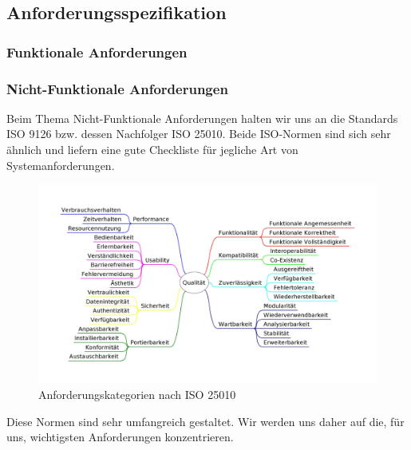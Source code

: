 \subsection{Anforderungsspezifikation}

\subsubsection{Funktionale Anforderungen}

\subsubsection{Nicht-Funktionale Anforderungen}
Beim Thema Nicht-Funktionale Anforderungen halten wir uns an die Standards ISO 9126\cite{ISO9126} bzw. dessen Nachfolger ISO 25010\cite{ISO9126_ISO25010}. Beide ISO-Normen sind sich sehr ähnlich und liefern eine gute Checkliste für jegliche Art von Systemanforderungen.

\begin{figure}[h]
	\centering
	\includegraphics[width=1\linewidth]{img/anforderungen/quality}
	\caption[Anforderungskategorien nach ISO 25010]{Anforderungskategorien nach  ISO 25010}
	\label{fig:ISO 25010}
\end{figure}


Diese Normen sind sehr umfangreich gestaltet. Wir werden uns daher auf die, für uns, wichtigsten Anforderungen konzentrieren.

